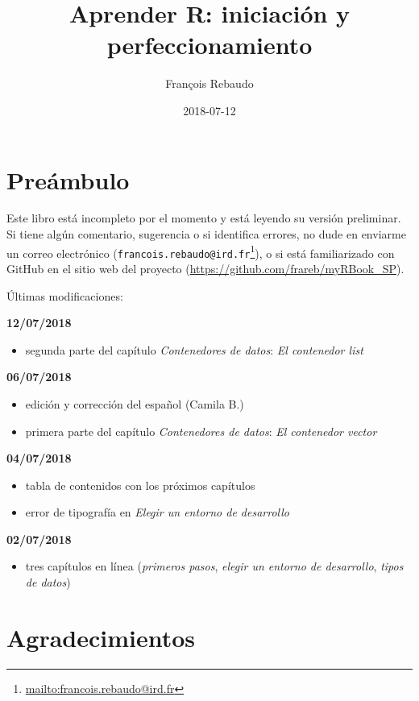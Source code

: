 \documentclass[]{book}
\title{Aprender R: iniciación y perfeccionamiento}
\author{François Rebaudo}
\date{2018-07-12}
\providecommand{\tightlist}{%
  \setlength{\itemsep}{0pt}\setlength{\parskip}{0pt}}
\let\rmarkdownfootnote\footnote%
\def\footnote{\protect\rmarkdownfootnote}
\renewcommand{\href}[2]{#2\footnote{\url{#1}}}
\begin{document}
\maketitle

{
\setcounter{tocdepth}{1}
\tableofcontents
}
\chapter{Preámbulo}\label{preambulo}

Este libro está incompleto por el momento y está leyendo su versión
preliminar. Si tiene algún comentario, sugerencia o si identifica
errores, no dude en enviarme un correo electrónico
(\href{mailto:francois.rebaudo@ird.fr}{\nolinkurl{francois.rebaudo@ird.fr}}),
o si está familiarizado con GitHub en el sitio web del proyecto
(\url{https://github.com/frareb/myRBook_SP}).

Últimas modificaciones:

\textbf{12/07/2018}

\begin{itemize}
\tightlist
\item
  segunda parte del capítulo \emph{Contenedores de datos}: \emph{El
  contenedor list}
\end{itemize}

\textbf{06/07/2018}

\begin{itemize}
\tightlist
\item
  edición y corrección del español (Camila B.)
\item
  primera parte del capítulo \emph{Contenedores de datos}: \emph{El
  contenedor vector}
\end{itemize}

\textbf{04/07/2018}

\begin{itemize}
\tightlist
\item
  tabla de contenidos con los próximos capítulos
\item
  error de tipografía en \emph{Elegir un entorno de desarrollo}
\end{itemize}

\textbf{02/07/2018}

\begin{itemize}
\tightlist
\item
  tres capítulos en línea (\emph{primeros pasos}, \emph{elegir un
  entorno de desarrollo}, \emph{tipos de datos})
\end{itemize}

\chapter{Agradecimientos}\label{remerciements}
\end{document}
